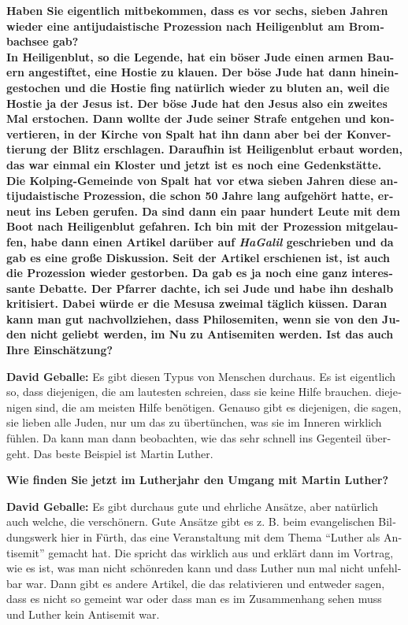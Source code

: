 \begin{otherlanguage}{ngerman}
\textbf{Haben Sie eigentlich mitbekommen, dass es vor sechs, sieben Jahren wieder eine antijudaistische Prozession nach Heiligenblut am Brombachsee gab? \\
In Heiligenblut, so die Legende, hat ein böser Jude einen armen Bauern angestiftet, eine Hostie zu klauen. Der böse Jude hat dann hineingestochen und die Hostie fing natürlich wieder zu bluten an, weil die Hostie ja der Jesus ist. Der böse Jude hat den Jesus also ein zweites Mal erstochen. Dann wollte der Jude seiner Strafe entgehen und konvertieren, in der Kirche von Spalt hat ihn dann aber bei der Konvertierung der Blitz erschlagen. Daraufhin ist Heiligenblut erbaut worden, das war einmal ein Kloster und jetzt ist es noch eine Gedenkstätte. Die Kolping-Gemeinde von Spalt hat vor etwa sieben Jahren diese antijudaistische Prozession, die schon 50 Jahre lang aufgehört hatte, erneut ins Leben gerufen. Da sind dann ein paar hundert Leute mit dem Boot nach Heiligenblut gefahren. Ich bin mit der Prozession mitgelaufen, habe dann einen Artikel darüber auf \textit{HaGalil} geschrieben und da gab es eine große Diskussion. Seit der Artikel erschienen ist, ist auch die Prozession wieder gestorben. Da gab es ja noch eine ganz interessante Debatte. Der Pfarrer dachte, ich sei Jude und habe ihn deshalb kritisiert. Dabei würde er die Mesusa zweimal täglich küssen. Daran kann man gut nachvollziehen, dass Philosemiten, wenn sie von den Juden nicht geliebt werden, im Nu zu Antisemiten werden. Ist das auch Ihre Einschätzung?}  

\textbf{David Geballe:} Es gibt diesen Typus von Menschen durchaus. Es ist eigentlich so, dass diejenigen, die am lautesten schreien, dass sie keine Hilfe brauchen. diejenigen sind, die am meisten Hilfe benötigen. Genauso gibt es diejenigen, die sagen, sie lieben alle Juden, nur um das zu übertünchen, was sie im Inneren wirklich fühlen. Da kann man dann beobachten, wie das sehr schnell ins Gegenteil übergeht. Das beste Beispiel ist Martin Luther. 

\textbf{Wie finden Sie jetzt im Lutherjahr den Umgang mit Martin Luther?} 

\textbf{David Geballe:} Es gibt durchaus gute und ehrliche Ansätze, aber natürlich auch welche, die verschönern. Gute Ansätze gibt es z. B. beim evangelischen Bildungswerk hier in Fürth, das eine Veranstaltung mit dem Thema "`Luther als Antisemit"' gemacht hat. Die spricht das wirklich aus und erklärt dann im Vortrag, wie es ist, was man nicht schönreden kann und dass Luther nun mal nicht unfehlbar war. Dann gibt es andere Artikel, die das relativieren und entweder sagen, dass es nicht so gemeint war oder dass man es im Zusammenhang sehen muss und Luther kein Antisemit war. 


\end{otherlanguage}
